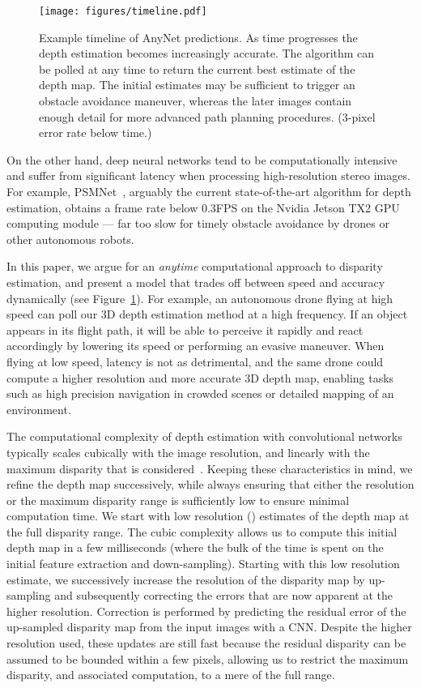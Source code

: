 \documentclass[letterpaper, 10 pt, conference]{ieeeconf}
\newcommand{\nameshort}[1]{AnyNet}
\begin{document}
\begin{figure}[t]
  \centering
\texttt{[image: figures/timeline.pdf]}
\caption{Example timeline of \nameshort{} predictions. As time progresses the depth estimation becomes increasingly accurate. The algorithm can be polled at any time to return the current best estimate of the depth map. The initial estimates may be sufficient to trigger an obstacle avoidance maneuver, whereas the later images contain enough detail for more advanced path planning procedures. (3-pixel error rate below time.)  }
  \label{fig:timeline}
 \vspace{-0.4cm}
\end{figure}


On the other hand, deep neural networks tend to be computationally intensive and suffer from significant latency when processing high-resolution stereo images. For example, PSMNet~\cite{zhao2017pyramid}, arguably the current state-of-the-art algorithm for depth estimation, obtains a frame rate below 0.3FPS on the Nvidia Jetson TX2 GPU computing module --- far too slow for timely obstacle avoidance by drones or other autonomous robots. 


In this paper, we argue for an \emph{anytime} computational approach to disparity estimation, and present a model that trades off between speed and accuracy dynamically (see Figure~\ref{fig:timeline}). For example, an autonomous drone flying at high speed can poll our 3D depth estimation method at a high frequency. If an object appears in its flight path, it will be able to perceive it rapidly and react accordingly by lowering its speed or performing an evasive maneuver. When flying at low speed, latency is not as detrimental, and the same drone could compute a higher resolution and more accurate 3D depth map, enabling tasks such as high precision navigation in crowded scenes or detailed mapping of an environment. 

The computational complexity of depth estimation with convolutional networks typically scales cubically with the image resolution, and linearly with the maximum disparity that is considered~\cite{kendall2017end}. Keeping these characteristics in mind, we refine the depth map successively, while always ensuring that either the resolution or the maximum disparity range is sufficiently low to ensure minimal computation time. 
We start with low resolution () estimates of the depth map at the full disparity range. The cubic complexity allows us to compute this initial depth map in a few milliseconds (where the bulk of the time is spent on the initial feature extraction and down-sampling). Starting with this low resolution estimate, we successively increase the resolution of the disparity map by up-sampling and subsequently correcting the errors that are now apparent at the higher resolution. Correction is performed by predicting the residual error of the up-sampled disparity map from the input images with a CNN. 
Despite the higher resolution used, these updates are still fast because the residual disparity can be assumed to be bounded within a few pixels, allowing us to restrict the maximum disparity, and associated computation, to a mere  of the full range.
\end{document}
